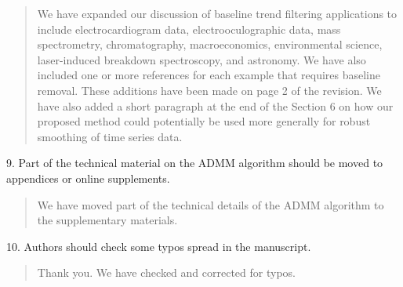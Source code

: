 \documentclass{article}
\makeatletter
\newcommand{\All}[2]{{\bf {\color{Sepia}@All from #1: #2}}\xspace}
\makeatother
\begin{document}
\begin{quote}
We have expanded our discussion of baseline trend filtering applications to include electrocardiogram data, electrooculographic data, mass spectrometry, chromatography, macroeconomics, environmental science, laser-induced breakdown spectroscopy, and astronomy. We have also included one or more references for each example that requires baseline removal. These additions have been made on page 2 of the revision. We have also added a short paragraph at the end of the Section 6 on how our proposed method could potentially be used more generally for robust smoothing of time series data.
\end{quote}

9. Part of the technical material on the ADMM algorithm should be moved to appendices or online supplements.

\begin{quote}
We have moved part of the technical details of the ADMM algorithm to the supplementary materials.
\end{quote}

10. Authors should check some typos spread in the manuscript.

\begin{quote}
Thank you. We have checked and corrected for typos.
\end{quote}



\end{document}
